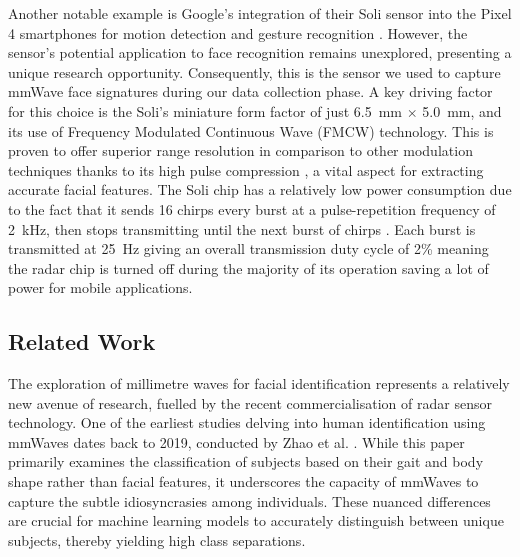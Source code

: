 \documentclass{mpaper}
\begin{document}
Another notable example is Google's integration of their Soli sensor into the Pixel 4 smartphones for motion detection and gesture recognition \cite{googleblog2020}. However, the sensor's potential application to face recognition remains unexplored, presenting a unique research opportunity. Consequently, this is the sensor we used to capture mmWave face signatures during our data collection phase. A key driving factor for this choice is the Soli's miniature form factor of just \qty{6.5}{\mm} $\times$ \qty{5.0}{\mm}, and its use of Frequency Modulated Continuous Wave (FMCW) technology. This is proven to offer superior range resolution in comparison to other modulation techniques thanks to its high pulse compression \cite{mahafza2005radar}, a vital aspect for extracting accurate facial features. The Soli chip has a relatively low power consumption due to the fact that it sends 16 chirps every burst at a pulse-repetition frequency of \qty{2}{\kHz}, then stops transmitting until the next burst of chirps \cite{hayashi2021radarnet, mitchell2023mmsense}. Each burst is transmitted at \qty{25}{\Hz} giving an overall transmission duty cycle of 2\% meaning the radar chip is turned off during the majority of its operation saving a lot of power for mobile applications.

\vspace{0.05cm}
\subsection{Related Work}
The exploration of millimetre waves for facial identification represents a relatively new avenue of research, fuelled by the recent commercialisation of radar sensor technology. One of the earliest studies delving into human identification using mmWaves dates back to 2019, conducted by Zhao et al. \cite{zhao2019mid}. While this paper primarily examines the classification of subjects based on their gait and body shape rather than facial features, it underscores the capacity of mmWaves to capture the subtle idiosyncrasies among individuals. These nuanced differences are crucial for machine learning models to accurately distinguish between unique subjects, thereby yielding high class separations.
\end{document}
